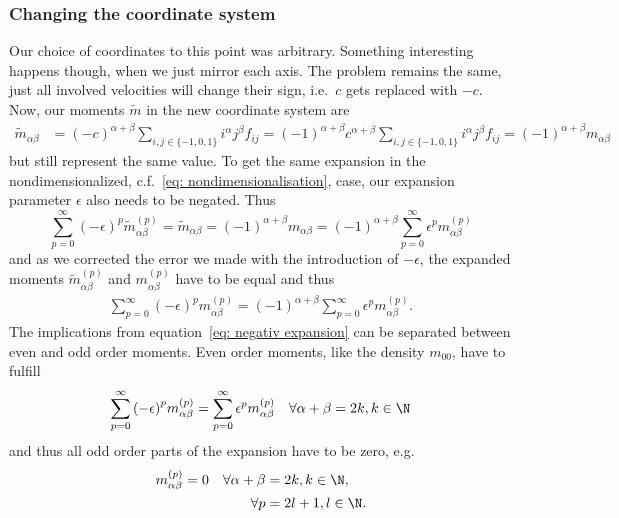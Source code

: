 \subsubsection{Changing the coordinate system}
\label{subs: Changing the coordinate system}
Our choice of coordinates to this point was arbitrary.
Something interesting happens though, when we just mirror each axis.
The problem remains the same, just all involved velocities will change their sign, i.e.\ $c$ gets replaced with $-c$.
Now, our moments $\tilde{m}$ in the new coordinate system are
\begin{align}
  \tilde{m}_{\alpha\beta} &= {(-c)}^{\alpha + \beta}\sum_{i,j \in \{-1,0,1\}} i^\alpha j^\beta f_{ij}
  ={(-1)}^{\alpha + \beta}{c}^{\alpha + \beta}\sum_{i,j \in \{-1,0,1\}} i^\alpha j^\beta f_{ij}
  ={(-1)}^{\alpha + \beta}  m_{\alpha\beta}
\end{align}
but still represent the same value.
To get the same expansion in the nondimensionalized, c.f.~\eqref{eq: nondimensionalisation}, case, our expansion parameter $\epsilon$ also needs to be negated.
Thus
\begin{equation}
     \sum_{p=0}^{\infty} {(-\epsilon)}^p \tilde{m}_{\alpha\beta}^{(p)}
     = \tilde{m}_{\alpha\beta}
     = {(-1)}^{\alpha + \beta}  m_{\alpha\beta}
     = {(-1)}^{\alpha + \beta} \sum_{p=0}^{\infty} \epsilon^p m_{\alpha\beta}^{(p)}
\end{equation}
and as we corrected the error we made with the introduction of $-\epsilon$, the expanded moments $\tilde{m}_{\alpha\beta}^{(p)}$ and $m_{\alpha\beta}^{(p)}$ have to be equal and thus
\begin{align}
  \label{eq: negativ expansion}
  \sum_{p=0}^{\infty} {(-\epsilon)}^p m_{\alpha\beta}^{(p)}
  = {(-1)}^{\alpha + \beta} \sum_{p=0}^{\infty} \epsilon^p m_{\alpha\beta}^{(p)}.
\end{align}
The implications from equation~\eqref{eq: negativ expansion} can be separated between even and odd order moments.
Even order moments, like the density $m_{00}$, have to fulfill
\begin{align}
  \label{eq: negativ expansion even}
  \sum_{p=0}^{\infty} {(-\epsilon)}^p m_{\alpha\beta}^{(p)}
  = \sum_{p=0}^{\infty} \epsilon^p m_{\alpha\beta}^{(p)} \quad \forall \alpha+\beta=2k, k\in\N
\end{align}
and thus all odd order parts of the expansion have to be zero, e.g.
\begin{equation}
  \label{eq: kill even moments odd order}
  \begin{aligned}
    m_{\alpha\beta}^{(p)} = 0 \quad
    \forall\alpha+\beta & = 2k, k\in\N, \\
    \forall p & = 2l+1, l\in\N.
  \end{aligned}
\end{equation}
